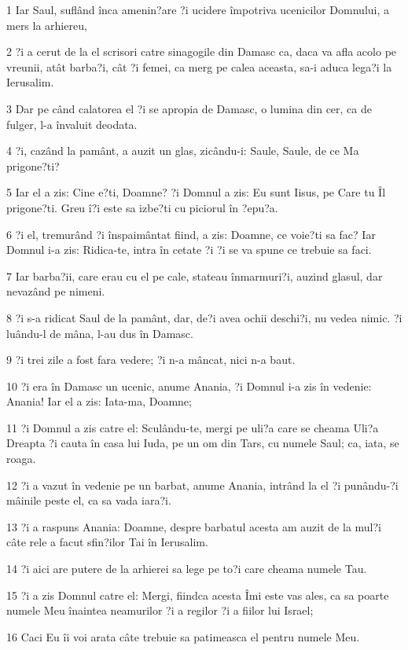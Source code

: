\par 1 Iar Saul, suflând înca amenin?are ?i ucidere împotriva ucenicilor Domnului, a mers la arhiereu,
\par 2 ?i a cerut de la el scrisori catre sinagogile din Damasc ca, daca va afla acolo pe vreunii, atât barba?i, cât ?i femei, ca merg pe calea aceasta, sa-i aduca lega?i la Ierusalim.
\par 3 Dar pe când calatorea el ?i se apropia de Damasc, o lumina din cer, ca de fulger, l-a învaluit deodata.
\par 4 ?i, cazând la pamânt, a auzit un glas, zicându-i: Saule, Saule, de ce Ma prigone?ti?
\par 5 Iar el a zis: Cine e?ti, Doamne? ?i Domnul a zis: Eu sunt Iisus, pe Care tu Îl prigone?ti. Greu î?i este sa izbe?ti cu piciorul în ?epu?a.
\par 6 ?i el, tremurând ?i înspaimântat fiind, a zis: Doamne, ce voie?ti sa fac? Iar Domnul i-a zis: Ridica-te, intra în cetate ?i ?i se va spune ce trebuie sa faci.
\par 7 Iar barba?ii, care erau cu el pe cale, stateau înmarmuri?i, auzind glasul, dar nevazând pe nimeni.
\par 8 ?i s-a ridicat Saul de la pamânt, dar, de?i avea ochii deschi?i, nu vedea nimic. ?i luându-l de mâna, l-au dus în Damasc.
\par 9 ?i trei zile a fost fara vedere; ?i n-a mâncat, nici n-a baut.
\par 10 ?i era în Damasc un ucenic, anume Anania, ?i Domnul i-a zis în vedenie: Anania! Iar el a zis: Iata-ma, Doamne;
\par 11 ?i Domnul a zis catre el: Sculându-te, mergi pe uli?a care se cheama Uli?a Dreapta ?i cauta în casa lui Iuda, pe un om din Tars, cu numele Saul; ca, iata, se roaga.
\par 12 ?i a vazut în vedenie pe un barbat, anume Anania, intrând la el ?i punându-?i mâinile peste el, ca sa vada iara?i.
\par 13 ?i a raspuns Anania: Doamne, despre barbatul acesta am auzit de la mul?i câte rele a facut sfin?ilor Tai în Ierusalim.
\par 14 ?i aici are putere de la arhierei sa lege pe to?i care cheama numele Tau.
\par 15 ?i a zis Domnul catre el: Mergi, fiindca acesta Îmi este vas ales, ca sa poarte numele Meu înaintea neamurilor ?i a regilor ?i a fiilor lui Israel;
\par 16 Caci Eu îi voi arata câte trebuie sa patimeasca el pentru numele Meu.
